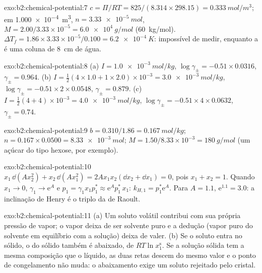 \begin{solution}{exo:b2:chemical-potential:7}
$c = \Pi/RT = 825/(8.314 \times 298.15) = \qty{0.333}{mol/m^3}$; em
\qty{1.000e-4}{m^3}, $n = \qty{3.33e-5}{mol}$, $M = 2.00/3.33 \times 10^{-5}
= \qty{6.0e4}{g/mol}$ (\qty{60}{kg/mol}). $\Delta T_f = 1.86 \times 3.33
\times 10^{-5}/0.100 = \qty{6.2e-4}{K}$: impossível de medir, enquanto a
 é uma coluna de \qty{8}{cm} de água.
\end{solution}

\begin{solution}{exo:b2:chemical-potential:8}
(a) $I = \qty{1.0e-3}{mol/kg}$, $\log\gamma_\pm = -0.51 \times 0.0316$,
$\gamma_\pm = 0.964$. (b) $I = \frac12(4 \times 1.0 + 1 \times 2.0) \times
10^{-3} = \qty{3.0e-3}{mol/kg}$, $\log\gamma_\pm = -0.51 \times 2 \times 0.0548$,
$\gamma_\pm = 0.879$. (c) $I = \frac12(4 + 4) \times 10^{-3} = \qty{4.0e-3}{mol/kg}$,
$\log\gamma_\pm = -0.51 \times 4 \times 0.0632$, $\gamma_\pm = 0.74$.
\end{solution}

\begin{solution}{exo:b2:chemical-potential:9}
$b = 0.310/1.86 = \qty{0.167}{mol/kg}$; $n = 0.167 \times 0.0500 =
\qty{8.33e-3}{mol}$; $M = 1.50/8.33 \times 10^{-3} = \qty{180}{g/mol}$ (um
açúcar do tipo hexose, por exemplo).
\end{solution}

\begin{solution}{exo:b2:chemical-potential:10}
$x_1\,\dd(Ax_2^2) + x_2\,\dd(Ax_1^2) = 2Ax_1x_2(\dd x_2 + \dd x_1) = 0$, pois
$x_1 + x_2 = 1$. Quando $x_1 \to 0$, $\gamma_1 \to \mathrm e^{A}$ e $p_1 =
\gamma_1x_1p_1^* \approx \mathrm e^{A}p_1^*\,x_1$: $k_{H,1} = p_1^*\mathrm e^A$.
Para $A = 1.1$, $\mathrm e^{1.1} = 3.0$: a inclinação de Henry é o triplo da de Raoult.
\end{solution}

\begin{solution}{exo:b2:chemical-potential:11}
(a) Um soluto volátil contribui com sua própria pressão de vapor; o vapor
deixa de ser solvente puro e a dedução (vapor puro do solvente em
equilíbrio com a solução) deixa de valer. (b) Se o soluto entra no sólido, o
 do sólido também é abaixado, de $RT\ln x_1^{\text{s}}$. Se a
solução sólida tem a mesma composição que o líquido, as duas retas descem
do mesmo valor e o ponto de congelamento não muda: o abaixamento exige um
soluto rejeitado pelo cristal.
\end{solution}

